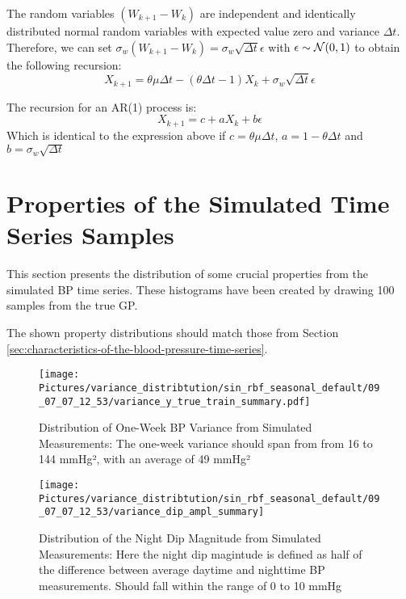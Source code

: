 The random variables $(W_{k+1} - W_k)$ are independent and identically distributed normal random variables
with expected value zero and variance $\Delta t$.
Therefore, we can set $\sigma_w (W_{k+1} - W_k) = \sigma_w \sqrt{\Delta t} \epsilon$ with $\epsilon \sim \operatorname{\mathcal{N}}(0,1)$
to obtain the following recursion:
$$ X_{k+1} = \theta \mu \Delta t - (\theta \Delta t - 1) X_k + \sigma_w \sqrt{\Delta t} \epsilon$$

The recursion for an AR(1) process is:
$$ X_{k+1} = c + a X_k + b \epsilon$$
Which is identical to the expression above if $c= \theta \mu \Delta t$, $a=1- \theta \Delta t$ and
$b= \sigma_w \sqrt{\Delta t}$



\section{Properties of the Simulated Time Series Samples}\label{sec:properties-of-the-simulated-time-series-samples}

This section presents the distribution of some crucial properties
from the simulated BP time series.
These histograms have been created by drawing 100 samples from the true GP.

The shown property distributions should match those from Section \ref{sec:characteristics-of-the-blood-pressure-time-series}.

\begin{figure}[h!]
    \centering
    \texttt{[image: 
        Pictures/variance\_distribtution/sin\_rbf\_seasonal\_default/09\_07\_07\_12\_53/variance\_y\_true\_train\_summary.pdf]}
    \caption[Distribution of One-Week BP Variance from Simulated Measurements]{
        Distribution of One-Week BP Variance from Simulated Measurements:
    The one-week variance should span from from 16 to 144 mmHg², with an average of 49 mmHg²}
    \label{fig:variance}
\end{figure}

\begin{figure}[h!]
    \centering
    \texttt{[image: 
       Pictures/variance\_distribtution/sin\_rbf\_seasonal\_default/09\_07\_07\_12\_53/variance\_dip\_ampl\_summary]}
    \caption[Distribution of the Night Dip Magnitude from Simulated Measurements]{
        Distribution of the Night Dip Magnitude from Simulated Measurements:
    Here the night dip magintude is defined as half of the difference between average daytime and nighttime BP measurements.
        Should fall within the range of 0 to 10 mmHg}
    \label{fig:dip_ampl}
\end{figure}




